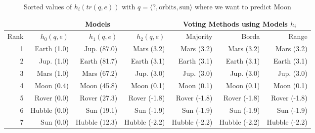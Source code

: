 \begin{table} 
\centering 
\begin{tabular}{r|r|r|r|r|r|r}
&\multicolumn{3}{|c|}{Models}&
\multicolumn{3}{|c}{Voting Methods using Models $h_i$}\\
 \hline 
Rank &$h_0(q, e)$ &$h_1(q, e)$ &$h_2(q, e)$ &Majority &Borda &Range\\
\hline
1 &Earth (1.0)&		Jup. (87.0)&		Mars (3.2)&		Mars (3.2) &Mars (3.2) &Mars (3.2)\\
2 &Jup. (1.0)&		Earth (81.7)&		Earth (3.1)&		Earth (3.1) &Earth (3.1) &Earth (3.1)\\
3 &Mars (1.0)&		Mars (67.2)&		Jup. (3.0)&		Jup. (3.0) &Jup. (3.0) &Jup. (3.0)\\
4 &Moon (0.4)&		Moon (45.8)&		Moon (0.1)&		Moon (0.1) &Moon (0.1) &Moon (0.1)\\
\hline \hline
5 &Rover (0.0)&		Rover (27.3)&		Rover (-1.8)&		Rover (-1.8) &Rover (-1.8) &Rover (-1.8)\\
6 &Hubble (0.0)&		Sun (19.1)&		Sun (-1.9)&		Sun (-1.9) &Sun (-1.9) &Sun (-1.9)\\
7 &Sun (0.0)&		Hubble (12.3)&		Hubble (-2.2)&		Hubble (-2.2) &Hubble (-2.2) &Hubble (-2.2)\\
\end{tabular}
\caption{Sorted values of $h_i(tr(q,e))$ with $q=\langle ?, \text{orbits}, \text{sun} \rangle$ where we want to predict Moon}
\end{table}